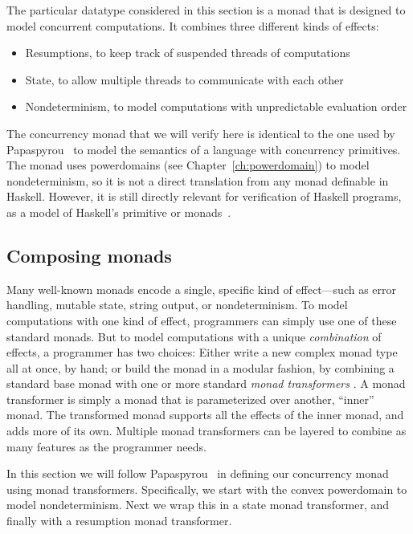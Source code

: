 The particular datatype considered in this section is a monad that is designed to model concurrent computations. It combines three different kinds of effects:
%
\begin{itemize}
\item Resumptions, to keep track of suspended threads of computations
\unmedskip
\item State, to allow multiple threads to communicate with each other
\unmedskip
\item Nondeterminism, to model computations with unpredictable evaluation order
\end{itemize}
%
The concurrency monad that we will verify here is identical to the one used by Papaspyrou~\cite{Papaspyrou01} to model the semantics of a language with concurrency primitives. The monad uses powerdomains (see Chapter~\ref{ch:powerdomain}) to model nondeterminism, so it is not a direct translation from any monad definable in Haskell. However, it is still directly relevant for verification of Haskell programs, as a model of Haskell's primitive  or  monads~\cite{thiemann95towards}.

\subsection{Composing monads}
\label{sec:case-composing-monads}

Many well-known monads encode a single, specific kind of effect---such as error handling, mutable state, string output, or nondeterminism. To model computations with one kind of effect, programmers can simply use one of these standard monads. But to model computations with a unique \emph{combination} of effects, a programmer has two choices: Either write a new complex monad type all at once, by hand; or build the monad in a modular fashion, by combining a standard base monad with one or more standard \emph{monad transformers} \cite{Moggi89, LHJ95}. A monad transformer is simply a monad that is parameterized over another, ``inner'' monad. The transformed monad supports all the effects of the inner monad, and adds more of its own. Multiple monad transformers can be layered to combine as many features as the programmer needs.

In this section we will follow Papaspyrou~\cite{Papaspyrou01} in defining our concurrency monad using monad transformers. Specifically, we start with the convex powerdomain to model nondeterminism. Next we wrap this in a state monad transformer, and finally with a resumption monad transformer.


